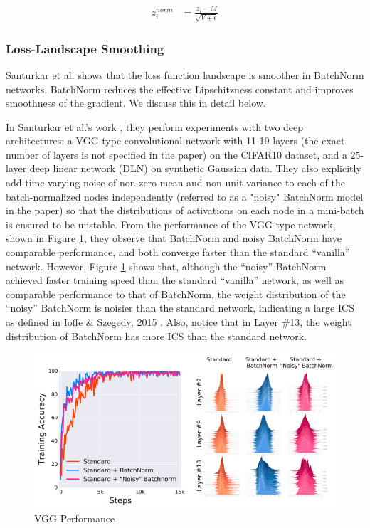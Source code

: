 \documentclass{article}
\begin{document}
\begin{align*}
    z_i^{norm}& = \frac{z_i-M}{\sqrt{V+\epsilon}}
\end{align*}


\subsubsection{Loss-Landscape Smoothing} \label{landsmooth}
Santurkar et al. \cite{landscape} shows that the loss function landscape is smoother in BatchNorm networks. BatchNorm reduces the effective Lipschitzness constant and improves smoothness of the gradient. We discuss this in detail below.

\textbf{}

In Santurkar et al.'s work \cite{landscape}, they perform experiments with two deep architectures: a VGG-type convolutional network with 11-19 layers (the exact number of layers is not specified in the paper) on the CIFAR10 dataset, and a 25-layer deep linear network (DLN) on synthetic Gaussian data. They also explicitly add time-varying noise of non-zero mean and non-unit-variance to each of the batch-normalized nodes independently (referred to as a "noisy" BatchNorm model in the paper) so that the distributions of activations on each node in a mini-batch is ensured to be unstable. From the performance of the VGG-type network, shown in Figure \ref{fig:vgg}, they observe that BatchNorm and noisy BatchNorm have comparable performance, and both converge faster than the standard ``vanilla'' network. However, Figure \ref{fig:vgg} shows that, although the ``noisy'' BatchNorm achieved faster training speed than the standard ``vanilla'' network, as well as comparable performance to that of BatchNorm, the weight distribution of the ``noisy'' BatchNorm  is noisier than the standard network, indicating a large ICS as defined in Ioffe \& Szegedy, 2015 \cite{batchnorm}. Also, notice that in Layer \#13, the weight distribution of BatchNorm has more ICS than the standard network.

\begin{figure}[h] 
	\centering
    \includegraphics[scale=0.6]{pics/batchNorm/Santurkar_fig2.jpg}
	\caption{VGG Performance}
	\label{fig:vgg}
\end{figure}
\end{document}
